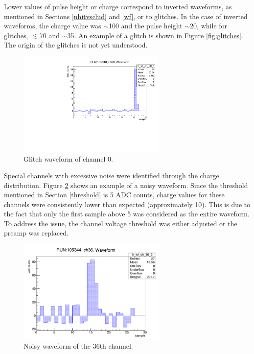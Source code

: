 Lower values of pulse height or charge correspond to inverted waveforms, as mentioned in Sections \ref{nhitvschid} and \ref{wf}, 
or to glitches. In the case of inverted waveforms, the charge value was $\sim$100 and the pulse height $\sim$20, while for glitches, $\lesssim$70 and $\sim$35. 
An example of a glitch is shown in Figure \ref{fig:glitches}. The origin of the glitches is not yet understood.
\begin{figure}[!h]
  \centering
  \includegraphics[width=0.65\textwidth]{figures/pdf/glitch.pdf}
  \caption{Glitch waveform of channel 0.}
  \label{fig:noisywf}
\end{figure}
Special channels with excessive noise were identified through the charge distribution. 
Figure \ref{fig:noisywf} shows an example of a noisy waveform. 
Since the threshold mentioned in Section \ref{threshold} is 5 ADC counts, charge values for these channels were consistently lower than expected (approximately 10). 
This is due to the fact that only the first sample above 5 was considered as the entire waveform.
To address the issue, the channel voltage threshold was either adjusted or the preamp was replaced.
\begin{figure}[!h]
  \centering
  \includegraphics[width=0.65\textwidth]{figures/pdf/noise.pdf}
  \caption{Noisy waveform of the 36th channel.}
  \label{fig:noisywf}
\end{figure}


